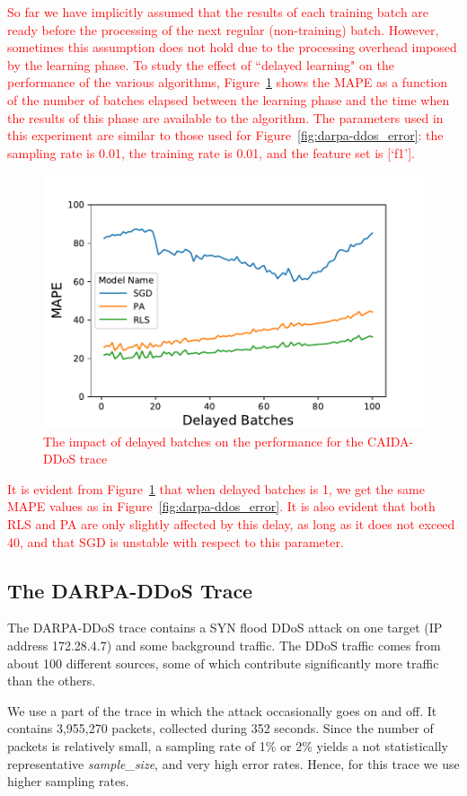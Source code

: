 \textcolor{red}{
So far we have implicitly assumed that the results of each training batch are ready
before the processing of the next regular (non-training) batch. However, sometimes this assumption does not hold
due to the processing overhead imposed by the learning phase. To study the effect of ``delayed learning"
on the performance of the various algorithms, Figure~\ref{fig:caida-ddos_delayed_batches} shows the MAPE as a function
of the number of batches elapsed between the learning phase and the time when the results of this phase are
available to the algorithm. 
The parameters used in this experiment are similar to those used for 
Figure~\ref{fig:darpa-ddos_error}: the sampling rate is 0.01, the training rate is 0.01, and the feature set is [‘f1’].
\begin{figure}[!t]
\centering
\includegraphics[width=.49\textwidth]{img/caida-ddos_delayed_batches.pdf}
\caption{The impact of delayed batches on the performance for the CAIDA-DDoS trace}
\label{fig:caida-ddos_delayed_batches}
\end{figure}
It is evident from Figure~\ref{fig:caida-ddos_delayed_batches} that
when delayed batches is 1, we get the same MAPE values as in Figure~\ref{fig:darpa-ddos_error}. 
It is also evident that both RLS and PA are only slightly affected by this delay, as long as it does not exceed 40, and 
that SGD is unstable with respect to this parameter.  
}



	\subsection{The DARPA-DDoS Trace}

		The DARPA-DDoS trace \cite{darpaddos} contains a SYN flood DDoS attack on one target (IP address 172.28.4.7) and some background traffic. The DDoS traffic comes from about 100 different sources, some of which contribute significantly more traffic than the others.
		
		We use a part of the trace in which the attack occasionally goes on and off. It contains 3,955,270 packets, collected during 352 seconds. Since the number of packets is relatively small, a sampling rate of 1\% or 2\% yields a not statistically representative \emph{sample\_size}, and very high error rates. Hence, for this trace we use higher sampling rates.%
		
